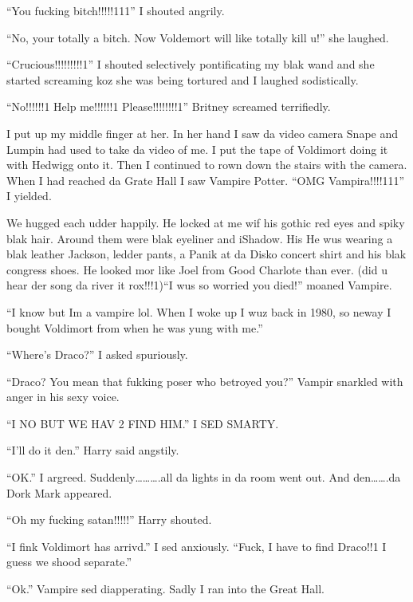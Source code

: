\enquote{You fucking bitch!!!!!111} I shouted angrily.

\enquote{No, your totally a bitch. Now Voldemort will like totally kill u!} she laughed.

\enquote{Crucious!!!!!!!!!1} I shouted selectively pontificating my blak wand and she started screaming koz she was being tortured and I laughed sodistically.

\begin{sloppypar}
    \enquote{No!!!!!!1 Help me!!!!!!1 Please!!!!!!!!1} Britney screamed terrifiedly.
\end{sloppypar}

I put up my middle finger at her. In her hand I saw da video camera Snape and Lumpin had used to take da video of me. I put the tape of Voldimort doing it with Hedwigg onto it. Then I continued to rown down the stairs with the camera. When I had reached da Grate Hall I saw Vampire Potter. \enquote{OMG Vampira!!!!111} I yielded.

We hugged each udder happily. He locked at me wif his gothic red eyes and spiky blak hair. Around them were blak eyeliner and iShadow. His He wus wearing a blak leather Jackson, ledder pants, a Panik at da Disko concert shirt and his blak congress shoes. He looked mor like Joel from Good Charlote than ever. (did u hear der song da river it rox!!!1)\enquote{I wus so worried you died!} moaned Vampire.

\enquote{I know but Im a vampire lol. When I woke up I wuz back in 1980, so neway I bought Voldimort from when he was yung with me.}

\enquote{Where's Draco?} I asked spuriously.

\enquote{Draco? You mean that fukking poser who betroyed you?} Vampir snarkled with anger in his sexy voice.

\enquote{I NO BUT WE HAV 2 FIND HIM\@.} I SED SMARTY\@.

\enquote{I'll do it den.} Harry said angstily.

\enquote{OK\@.} I argreed. Suddenly……….all da lights in da room went out. And den…….da Dork Mark appeared.

\enquote{Oh my fucking satan!!!!!} Harry shouted.

\enquote{I fink Voldimort has arrivd.} I sed anxiously. \enquote{Fuck, I have to find Draco!!1 I guess we shood separate.}

\enquote{Ok.} Vampire sed diapperating. Sadly I ran into the Great Hall.
